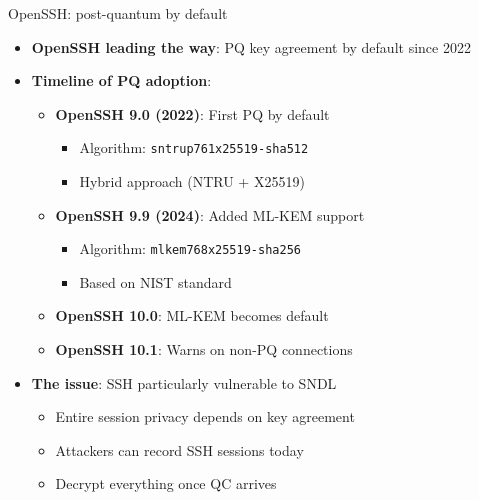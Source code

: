 \ifdefined\PRESENTATION\else\PassOptionsToClass{handout}{beamer}\fi\documentclass[aspectratio=169, lualatex]{beamer}
\begin{document}
\begin{frame}{OpenSSH: post-quantum by default}
	\begin{itemize}
		\item \textbf{OpenSSH leading the way}: PQ key agreement by default since 2022
		\item \textbf{Timeline of PQ adoption}:
		      \begin{itemize}
			      \item \textbf{OpenSSH 9.0 (2022)}: First PQ by default
			            \begin{itemize}
				            \item Algorithm: \texttt{sntrup761x25519-sha512}
				            \item Hybrid approach (NTRU + X25519)
			            \end{itemize}
			      \item \textbf{OpenSSH 9.9 (2024)}: Added ML-KEM support
			            \begin{itemize}
				            \item Algorithm: \texttt{mlkem768x25519-sha256}
				            \item Based on NIST standard
			            \end{itemize}
			      \item \textbf{OpenSSH 10.0}: ML-KEM becomes default
			      \item \textbf{OpenSSH 10.1}: Warns on non-PQ connections
		      \end{itemize}
		\item \textbf{The issue}: SSH particularly vulnerable to SNDL
		      \begin{itemize}
			      \item Entire session privacy depends on key agreement
			      \item Attackers can record SSH sessions today
			      \item Decrypt everything once QC arrives
		      \end{itemize}
	\end{itemize}
\end{frame}
\end{document}
